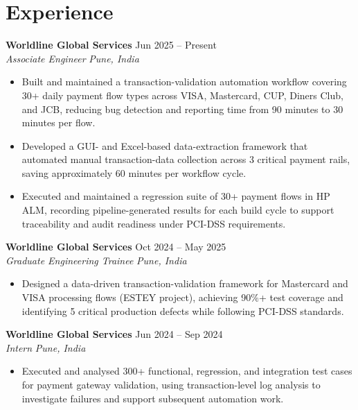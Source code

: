 \documentclass[a4paper,9.5pt]{article}
\begin{document}
\section{Experience}
\textbf{Worldline Global Services} \hfill Jun 2025 -- Present\\
\textit{\small Associate Engineer} \hfill \textit{\small Pune, India}
\begin{itemize}\small
\item Built and maintained a transaction-validation automation workflow covering 30+ daily payment flow types across VISA, Mastercard, CUP, Diners Club, and JCB, reducing bug detection and reporting time from 90 minutes to 30 minutes per flow.
\item Developed a GUI- and Excel-based data-extraction framework that automated manual transaction-data collection across 3 critical payment rails, saving approximately 60 minutes per workflow cycle.
\item Executed and maintained a regression suite of 30+ payment flows in HP ALM, recording pipeline-generated results for each build cycle to support traceability and audit readiness under PCI-DSS requirements.
\end{itemize}
\textbf{Worldline Global Services} \hfill Oct 2024 -- May 2025\\
\textit{\small Graduate Engineering Trainee} \hfill \textit{\small Pune, India}
\begin{itemize}\small
\item Designed a data-driven transaction-validation framework for Mastercard and VISA processing flows (ESTEY project), achieving 90\%+ test coverage and identifying 5 critical production defects while following PCI-DSS standards.
\end{itemize}
\textbf{Worldline Global Services} \hfill Jun 2024 -- Sep 2024\\
\textit{\small Intern} \hfill \textit{\small Pune, India}
\begin{itemize}\small
\item Executed and analysed 300+ functional, regression, and integration test cases for payment gateway validation, using transaction-level log analysis to investigate failures and support subsequent automation work.
\end{itemize}
\end{document}
